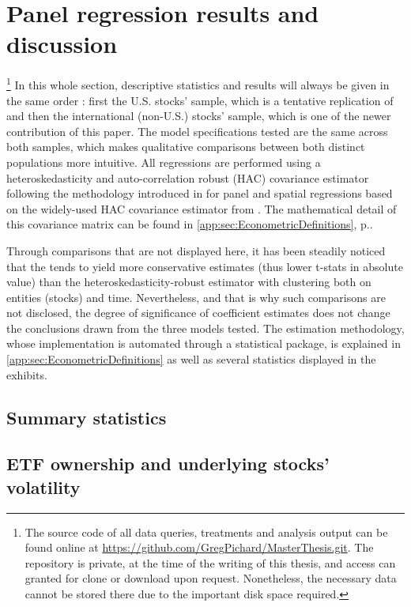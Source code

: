 \section{Panel regression results and discussion}\footnote{The source code of all data queries, treatments and analysis output can be found online at \url{https://github.com/GregPichard/MasterThesis.git}. The repository is private, at the time of the writing of this thesis, and access can granted for clone or download upon request. Nonetheless, the necessary data cannot be stored there due to the important disk space required.}
\label{sec:Results}
In this whole section, descriptive statistics and results will always be given in the same order : first the U.S. stocks' sample, which is a tentative replication of \textcite{Ben-David2018} and then the international (non-U.S.) stocks' sample, which is one of the newer contribution of this paper. The model specifications tested are the same across both samples, which makes qualitative comparisons between both distinct populations more intuitive. All regressions are performed using a heteroskedasticity and auto-correlation robust (HAC) covariance estimator following the methodology introduced in \textcite{Driscoll1998} for panel and spatial regressions based on the widely-used HAC covariance estimator from \textcite{Newey1987}. The mathematical detail of this covariance matrix can be found in \autoref{app:sec:EconometricDefinitions}, p.\pageref{app:sec:EconometricDefinitions}.

Through comparisons that are not displayed here, it has been steadily noticed that the \textcite{Newey1987} tends to yield more conservative estimates (thus lower t-stats in absolute value) than the heteroskedasticity-robust estimator with clustering both on entities (stocks) and time. Nevertheless, and that is why such comparisons are not disclosed, the degree of significance of coefficient estimates does not change the conclusions drawn from the three models tested.  The estimation methodology, whose implementation is automated through a statistical package, is explained in \autoref{app:sec:EconometricDefinitions} as well as several statistics displayed in the exhibits.

\subsection{Summary statistics}


\subsection{ETF ownership and underlying stocks' volatility}
\label{sec:Results:sub:Volatility}
